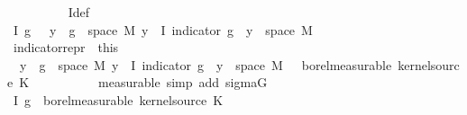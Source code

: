 \begin{isabellebody}
\ \ \ \ \ \ \ \ \isamarkupfalse%
\ I{\isacharunderscore}{\kern0pt}def\ \isacommand{{\isachardot}{\kern0pt}{\isachardot}{\kern0pt}}\isamarkupfalse%
\isanewline
\ \ \ \ \ \ \isamarkupfalse%
\ \isamarkupfalse%
\ {\isachardoublequoteopen}I\ g\ {\isasymomega}\ {\isacharequal}{\kern0pt}\ {\isacharparenleft}{\kern0pt}{\isasymSum}y\ {\isasymin}\ g\ {\isacharbackquote}{\kern0pt}\ space\ {\isacharquery}{\kern0pt}M{\isachardot}{\kern0pt}\ y\ {\isacharasterisk}{\kern0pt}\ I\ {\isacharparenleft}{\kern0pt}indicator\ {\isacharparenleft}{\kern0pt}g\ {\isacharminus}{\kern0pt}{\isacharbackquote}{\kern0pt}\ {\isacharbraceleft}{\kern0pt}y{\isacharbraceright}{\kern0pt}\ {\isasyminter}\ space\ {\isacharquery}{\kern0pt}M{\isacharparenright}{\kern0pt}{\isacharparenright}{\kern0pt}\ {\isasymomega}\isanewline
\ \ \ \ \ \ \ \ \isacommand{{\isachardot}{\kern0pt}}\isamarkupfalse%
\isanewline
\ \ \ \ \isacommand{{\isacharbraceright}{\kern0pt}}\isamarkupfalse%
\ \isamarkupfalse%
\ indicator{\isacharunderscore}{\kern0pt}repr\ {\isacharequal}{\kern0pt}\ this\isanewline
\ \ \ \ \isamarkupfalse%
\ {\isachardoublequoteopen}{\isacharparenleft}{\kern0pt}{\isasymlambda}{\isasymomega}\ {\isacharparenleft}{\kern0pt}{\isasymSum}y\ {\isasymin}\ g\ {\isacharbackquote}{\kern0pt}\ space\ {\isacharquery}{\kern0pt}M{\isachardot}{\kern0pt}\ y\ {\isacharasterisk}{\kern0pt}\ I\ {\isacharparenleft}{\kern0pt}indicator\ {\isacharparenleft}{\kern0pt}g\ {\isacharminus}{\kern0pt}{\isacharbackquote}{\kern0pt}\ {\isacharbraceleft}{\kern0pt}y{\isacharbraceright}{\kern0pt}\ {\isasyminter}\ space\ {\isacharquery}{\kern0pt}M{\isacharparenright}{\kern0pt}{\isacharparenright}{\kern0pt}\ {\isasymomega}\ {\isasymin}\ borel{\isacharunderscore}{\kern0pt}measurable\ {\isacharparenleft}{\kern0pt}kernel{\isacharunderscore}{\kern0pt}source\ K{\isacharparenright}{\kern0pt}{\isachardoublequoteclose}\isanewline
\ \ \ \ \ \ \isamarkupfalse%
\ {\isacharasterisk}{\kern0pt}\ \isamarkupfalse%
\ {\isacharparenleft}{\kern0pt}measurable{\isacharcomma}{\kern0pt}\ simp\ add{\isacharcolon}{\kern0pt}\ sigma{\isacharunderscore}{\kern0pt}G{\isacharparenright}{\kern0pt}\isanewline
\ \ \ \ \isamarkupfalse%
\ \isamarkupfalse%
\ {\isachardoublequoteopen}I\ g\ {\isasymin}\ borel{\isacharunderscore}{\kern0pt}measurable\ {\isacharparenleft}{\kern0pt}kernel{\isacharunderscore}{\kern0pt}source\ K{\isacharparenright}{\kern0pt}{\isachardoublequoteclose}\isanewline

\end{isabellebody}
